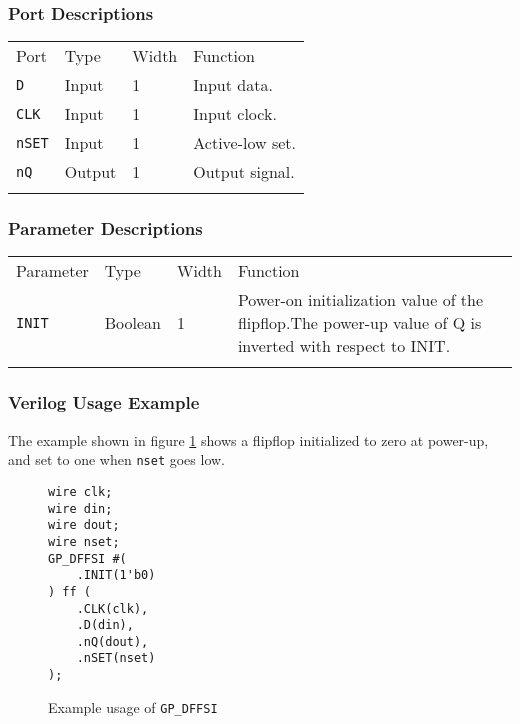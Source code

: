 \documentclass[11pt]{article}
\newcommand{\tokenstyle}[1]{\texttt{#1}}
\newcommand{\wirestyle}[1]{\texttt{#1}}
\newcommand{\whenstyle}[1]{{\fontseries{sb}\selectfont#1}}
\newcommand{\thinhline}{\Xhline{1\arrayrulewidth}}
\newcommand{\thickhline}{\Xhline{2.5\arrayrulewidth}}
\begin{document}
\subsubsection{Port Descriptions}

\begin{tabularx}{\textwidth}{lllX}
\thinhline
\whenstyle{Port} & \whenstyle{Type} & \whenstyle{Width} & \whenstyle{Function} \\
\thickhline
\tokenstyle{D} & Input & 1 & Input data. \\
\thinhline
\tokenstyle{CLK} & Input & 1 & Input clock. \\
\thinhline
\tokenstyle{nSET} & Input & 1 & Active-low set. \\
\thinhline
\tokenstyle{nQ} & Output & 1 & Output signal. \\
\thinhline
\end{tabularx}

\subsubsection{Parameter Descriptions}

\begin{tabularx}{\textwidth}{lllX}
\thinhline
\whenstyle{Parameter} & \whenstyle{Type} & \whenstyle{Width} & \whenstyle{Function} \\
\thickhline
\tokenstyle{INIT} & Boolean & 1 & Power-on initialization value of the flipflop.\newline The power-up value of Q is 
inverted with respect to INIT.\\
\thinhline
\end{tabularx}

\subsubsection{Verilog Usage Example}

The example shown in figure \ref{gp-dffsi-example} shows a flipflop initialized to zero at power-up, and set to one
when \wirestyle{nset} goes low.

\begin{figure}[h]
\begin{lstlisting}
wire clk;
wire din;
wire dout;
wire nset;
GP_DFFSI #(
	.INIT(1'b0)
) ff (
	.CLK(clk),
	.D(din),
	.nQ(dout),
	.nSET(nset)
);
\end{lstlisting}
\caption{Example usage of \tokenstyle{GP\_DFFSI}}
\label{gp-dffsi-example}
\end{figure}
\end{document}
